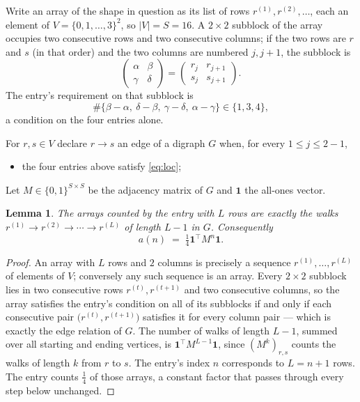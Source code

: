 \documentclass[11pt,a4paper]{article}
\theoremstyle{plain}
\newtheorem{lemma}[theorem]{Lemma}
\theoremstyle{definition}
\begin{document}
Write an array of the shape in question as its list of rows
$r^{(1)},r^{(2)},\dots$, each an element of
$V=\{0,1,\dots,3\}^{2}$, so $|V|=S=16$. A $2\times2$ subblock of the array
occupies two consecutive rows and two consecutive columns; if the two rows are $r$
and $s$ (in that order) and the two columns are numbered $j,j+1$,
the subblock is
\[
\begin{pmatrix}\alpha&\beta\\\gamma&\delta\end{pmatrix}=\begin{pmatrix}r_j&r_{j+1}\\s_j&s_{j+1}\end{pmatrix}.
\]
The entry's requirement on that subblock is
\begin{equation}\label{eq:loc}
\#\{\beta-\alpha,\ \delta-\beta,\ \gamma-\delta,\ \alpha-\gamma\}\in\{1,3,4\},
\end{equation}
a condition on the four entries alone.

For $r,s\in V$ declare $r\to s$ an edge of a digraph $G$ when, for every
$1\le j\le 2-1$,
\begin{itemize}
\item the four entries above satisfy \eqref{eq:loc};

\end{itemize}
Let $M\in\{0,1\}^{S\times S}$ be the adjacency matrix of $G$ and $\mathbf{1}$ the
all-ones vector.

\begin{lemma}\label{lem:walk}
The arrays counted by the entry with $L$ rows are exactly the walks
$r^{(1)}\to r^{(2)}\to\cdots\to r^{(L)}$ of length $L-1$ in $G$. Consequently
\[
a(n)\;=\;\tfrac1{4}\mathbf{1}^{\!\top}M^{n}\mathbf{1} .
\]
\end{lemma}

\begin{proof}
An array with $L$ rows and $2$ columns is precisely a sequence
$r^{(1)},\dots,r^{(L)}$ of elements of $V$; conversely any such sequence is an array.
Every $2\times2$ subblock lies in two consecutive rows $r^{(t)},r^{(t+1)}$ and two
consecutive columns, so the array satisfies the entry's condition on all of its subblocks
if and only if each consecutive pair $\bigl(r^{(t)},r^{(t+1)}\bigr)$ satisfies it for
every column pair --- which is exactly the edge relation of $G$. The number of walks of
length $L-1$, summed over all starting and ending vertices, is
$\mathbf{1}^{\!\top}M^{L-1}\mathbf{1}$, since $(M^{k})_{r,s}$ counts the walks of
length $k$ from $r$ to $s$. The entry's index $n$ corresponds to $L=n+1$ rows. The entry counts $\tfrac1{4}$ of those arrays, a constant factor that passes through every step below unchanged.
\end{proof}
\end{document}

